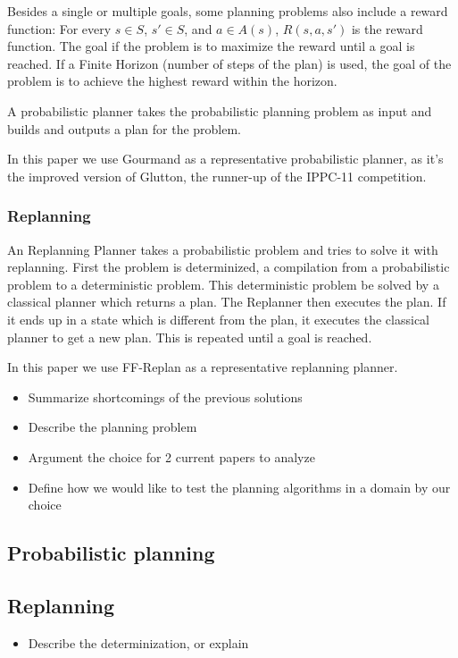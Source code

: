 \documentclass[runningheads,a4paper]{llncs}
\begin{document}

Besides a single or multiple goals, some planning problems also include a
reward function: For every $s \in S$, $s' \in S$, and $a \in A(s)$,
$R(s,a,s')$ is the reward function. The goal if the problem is to maximize
the reward until a goal is reached. If a Finite Horizon (number of steps of the
plan) is used, the goal of the problem is to achieve the highest reward within
the horizon.

A probabilistic planner takes the probabilistic planning problem as input and
builds and outputs a plan for the problem.

In this paper we use Gourmand as a representative probabilistic planner, as
it's the improved version of Glutton, the runner-up of the IPPC-11 competition.

\subsubsection{Replanning}

An Replanning Planner takes a probabilistic problem and tries to solve it with
replanning. First the problem is determinized, a compilation from a
probabilistic problem to a deterministic problem. This deterministic problem
be solved by a classical planner which returns a plan. The Replanner then
executes the plan. If it ends up in a state which is different from the plan,
it executes the classical planner to get a new plan. This is repeated until a
goal is reached.

In this paper we use FF-Replan as a representative replanning planner.

\begin{itemize}
	\item Summarize shortcomings of the previous solutions
	\item Describe the planning problem
	\item Argument the choice for 2 current papers to analyze
	\item Define how we would like to test the planning algorithms in a domain by our choice
\end{itemize}

\subsection{Probabilistic planning}

\subsection{Replanning}
\begin{itemize}
	\item Describe the determinization, or explain
\end{itemize}
\end{document}
